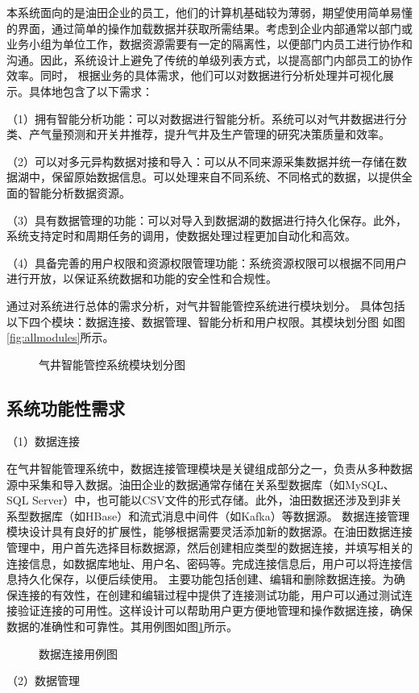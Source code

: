 本系统面向的是油田企业的员工，他们的计算机基础较为薄弱，期望使用简单易懂的界面，通过简单的操作加载数据并获取所需结果。考虑到企业内部通常以部门或业务小组为单位工作，数据资源需要有一定的隔离性，以便部门内员工进行协作和沟通。因此，系统设计上避免了传统的单级列表方式，以提高部门内部员工的协作效率。同时，
根据业务的具体需求，他们可以对数据进行分析处理并可视化展示。具体地包含了以下需求：

（1）拥有智能分析功能：可以对数据进行智能分析。系统可以对气井数据进行分类、产气量预测和开关井推荐，提升气井及生产管理的研究决策质量和效率。

（2）可以对多元异构数据对接和导入：可以从不同来源采集数据并统一存储在数据湖中，保留原始数据信息。可以处理来自不同系统、不同格式的数据，以提供全面的智能分析数据资源。

（3）具有数据管理的功能：可以对导入到数据湖的数据进行持久化保存。此外，系统支持定时和周期任务的调用，使数据处理过程更加自动化和高效。

（4）具备完善的用户权限和资源权限管理功能：系统资源权限可以根据不同用户进行开放，以保证系统数据和功能的安全性和合规性。

通过对系统进行总体的需求分析，对气井智能管控系统进行模块划分。
具体包括以下四个模块：数据连接、数据管理、智能分析和用户权限。其模块划分图
如图\ref{fig:allmodules}所示。
\begin{figure}[H]
    \centering
    \caption{气井智能管控系统模块划分图}
\end{figure}
\subsection{系统功能性需求}
（1）数据连接

在气井智能管理系统中，数据连接管理模块是关键组成部分之一，负责从多种数据源中采集和导入数据。油田企业的数据通常存储在关系型数据库（如MySQL、SQL Server）中，也可能以CSV文件的形式存储。此外，油田数据还涉及到非关系型数据库（如HBase）和流式消息中间件（如Kafka）等数据源。
数据连接管理模块设计具有良好的扩展性，能够根据需要灵活添加新的数据源。在油田数据连接管理中，用户首先选择目标数据源，然后创建相应类型的数据连接，并填写相关的连接信息，如数据库地址、用户名、密码等。完成连接信息后，用户可以将连接信息持久化保存，以便后续使用。
主要功能包括创建、编辑和删除数据连接。为确保连接的有效性，在创建和编辑过程中提供了连接测试功能，用户可以通过测试连接验证连接的可用性。这样设计可以帮助用户更方便地管理和操作数据连接，确保数据的准确性和可靠性。其用例图如图\ref{fig:dataconnectionusecase}所示。
\begin{figure}[H]
    \centering
    \caption{数据连接用例图}
    
    \label{fig:dataconnectionusecase}
\end{figure}
（2）数据管理 

